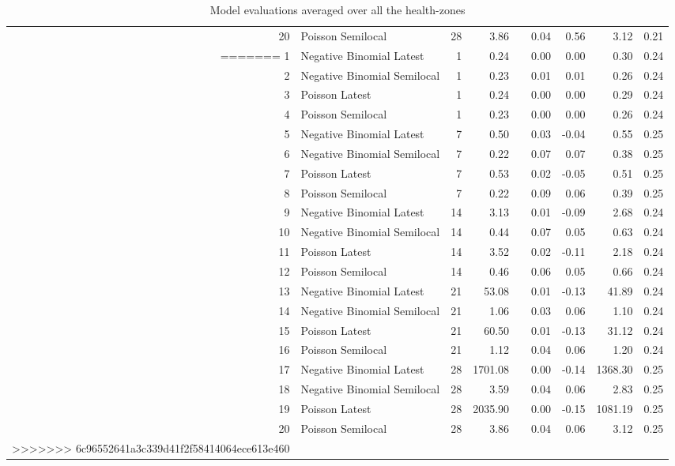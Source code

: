 \begin{table}[ht]
\begin{tabular}{rlrrrrrrr}
  20 & Poisson Semilocal &  28 & 3.86 &  & 0.04 & 0.56 & 3.12 & 0.21 \\ 
=======
1 & Negative Binomial Latest &   1 & 0.24 &  & 0.00 & 0.00 & 0.30 & 0.24 \\ 
  2 & Negative Binomial Semilocal &   1 & 0.23 &  & 0.01 & 0.01 & 0.26 & 0.24 \\ 
  3 & Poisson Latest &   1 & 0.24 &  & 0.00 & 0.00 & 0.29 & 0.24 \\ 
  4 & Poisson Semilocal &   1 & 0.23 &  & 0.00 & 0.00 & 0.26 & 0.24 \\ 
  5 & Negative Binomial Latest &   7 & 0.50 &  & 0.03 & -0.04 & 0.55 & 0.25 \\ 
  6 & Negative Binomial Semilocal &   7 & 0.22 &  & 0.07 & 0.07 & 0.38 & 0.25 \\ 
  7 & Poisson Latest &   7 & 0.53 &  & 0.02 & -0.05 & 0.51 & 0.25 \\ 
  8 & Poisson Semilocal &   7 & 0.22 &  & 0.09 & 0.06 & 0.39 & 0.25 \\ 
  9 & Negative Binomial Latest &  14 & 3.13 &  & 0.01 & -0.09 & 2.68 & 0.24 \\ 
  10 & Negative Binomial Semilocal &  14 & 0.44 &  & 0.07 & 0.05 & 0.63 & 0.24 \\ 
  11 & Poisson Latest &  14 & 3.52 &  & 0.02 & -0.11 & 2.18 & 0.24 \\ 
  12 & Poisson Semilocal &  14 & 0.46 &  & 0.06 & 0.05 & 0.66 & 0.24 \\ 
  13 & Negative Binomial Latest &  21 & 53.08 &  & 0.01 & -0.13 & 41.89 & 0.24 \\ 
  14 & Negative Binomial Semilocal &  21 & 1.06 &  & 0.03 & 0.06 & 1.10 & 0.24 \\ 
  15 & Poisson Latest &  21 & 60.50 &  & 0.01 & -0.13 & 31.12 & 0.24 \\ 
  16 & Poisson Semilocal &  21 & 1.12 &  & 0.04 & 0.06 & 1.20 & 0.24 \\ 
  17 & Negative Binomial Latest &  28 & 1701.08 &  & 0.00 & -0.14 & 1368.30 & 0.25 \\ 
  18 & Negative Binomial Semilocal &  28 & 3.59 &  & 0.04 & 0.06 & 2.83 & 0.25 \\ 
  19 & Poisson Latest &  28 & 2035.90 &  & 0.00 & -0.15 & 1081.19 & 0.25 \\ 
  20 & Poisson Semilocal &  28 & 3.86 &  & 0.04 & 0.06 & 3.12 & 0.25 \\ 
>>>>>>> 6c96552641a3c339d41f2f58414064ece613e460
   \hline
\end{tabular}
\caption{Model evaluations averaged over all the health-zones} 
\label{tab:hz_evo}
\end{table}
